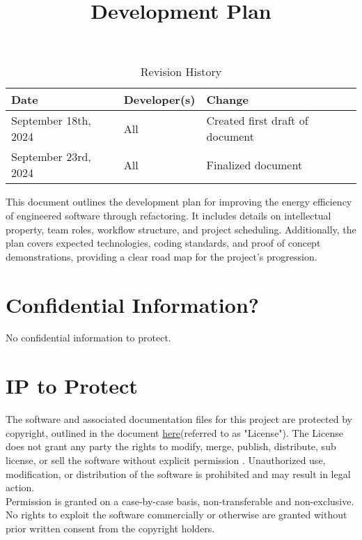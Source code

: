 \documentclass{article}
\title{Development Plan\\ \progname}
\author{\authname}
\date{}
\begin{document}
\maketitle

\begin{table}[hp]
  \caption{Revision History} \label{TblRevisionHistory}
  \begin{tabularx}{\textwidth}{llX}
    \toprule
    \textbf{Date} & \textbf{Developer(s)} & \textbf{Change}\\
    \midrule
    September 18th, 2024 & All & Created first draft of document\\
    September 23rd, 2024 & All & Finalized document\\
    \bottomrule
  \end{tabularx}
\end{table}

\newpage{}

\noindent
This document outlines the development plan for improving the energy efficiency of
engineered software through refactoring. It includes details on intellectual property,
team roles, workflow structure, and project scheduling. Additionally, the plan covers
expected technologies, coding standards, and proof of concept demonstrations, providing
a clear road map for the project's progression.

\section{Confidential Information?}

No confidential information to protect.
\section{IP to Protect}

\hspace{\parindent}The software and associated documentation files for this project are protected by copyright, outlined in the document \href{https://github.com/ssm-lab/capstone--source-code-optimizer/blob/documentation/LICENSE}{ here}(referred to as "License"). The License does not grant any party the rights to modify, merge, publish, distribute, sub license, or sell the software without explicit permission .
Unauthorized use, modification, or distribution of the software is prohibited and may result in legal action.
\\

\hspace{\parindent} Permission is granted on a case-by-case basis, non-transferable and non-exclusive. No rights to exploit the software commercially or otherwise are granted without prior written consent from the copyright holders.
\end{document}
